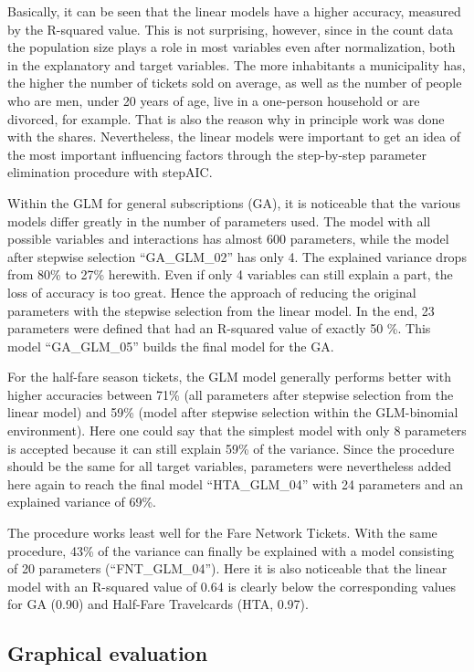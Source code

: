 \documentclass[
]{article}
\begin{document}
Basically, it can be seen that the linear models have a higher accuracy,
measured by the R-squared value. This is not surprising, however, since
in the count data the population size plays a role in most variables
even after normalization, both in the explanatory and target variables.
The more inhabitants a municipality has, the higher the number of
tickets sold on average, as well as the number of people who are men,
under 20 years of age, live in a one-person household or are divorced,
for example. That is also the reason why in principle work was done with
the shares. Nevertheless, the linear models were important to get an
idea of the most important influencing factors through the step-by-step
parameter elimination procedure with stepAIC.

Within the GLM for general subscriptions (GA), it is noticeable that the
various models differ greatly in the number of parameters used. The
model with all possible variables and interactions has almost 600
parameters, while the model after stepwise selection ``GA\_GLM\_02'' has
only 4. The explained variance drops from 80\% to 27\% herewith. Even if
only 4 variables can still explain a part, the loss of accuracy is too
great. Hence the approach of reducing the original parameters with the
stepwise selection from the linear model. In the end, 23 parameters were
defined that had an R-squared value of exactly 50 \%. This model
``GA\_GLM\_05'' builds the final model for the GA.

For the half-fare season tickets, the GLM model generally performs
better with higher accuracies between 71\% (all parameters after
stepwise selection from the linear model) and 59\% (model after stepwise
selection within the GLM-binomial environment). Here one could say that
the simplest model with only 8 parameters is accepted because it can
still explain 59\% of the variance. Since the procedure should be the
same for all target variables, parameters were nevertheless added here
again to reach the final model ``HTA\_GLM\_04'' with 24 parameters and
an explained variance of 69\%.

The procedure works least well for the Fare Network Tickets. With the
same procedure, 43\% of the variance can finally be explained with a
model consisting of 20 parameters (``FNT\_GLM\_04''). Here it is also
noticeable that the linear model with an R-squared value of 0.64 is
clearly below the corresponding values for GA (0.90) and Half-Fare
Travelcards (HTA, 0.97).

\hypertarget{graphical-evaluation}{%
\subsection{Graphical evaluation}\label{graphical-evaluation}}
\end{document}
